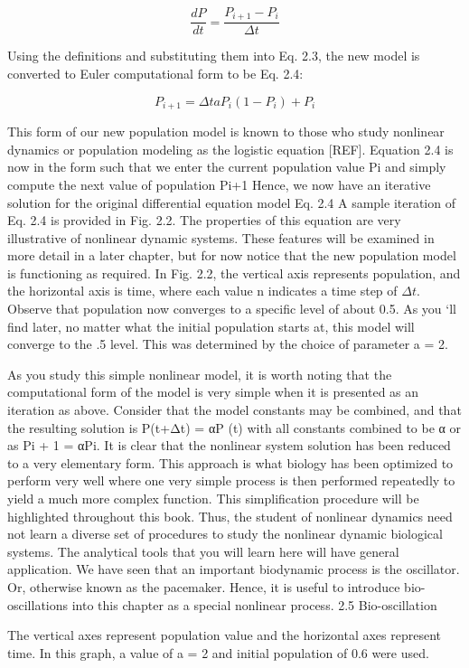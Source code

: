 \documentclass[12pt]{article}
\begin{document}
\[
\frac{dP}{dt} = \frac{P_{i+1} - P_i}{\Delta t}
\]


Using the definitions and substituting them into Eq. 2.3, the new model is converted
to Euler computational form to be Eq. 2.4:

\[
P_{i+1} = \Delta t a P_i(1-P_i) + P_i
\]

This form of our new population model is known to those who study nonlinear
dynamics or population modeling as the logistic equation [REF]. Equation 2.4 is
now in the form such that we enter the current population value Pi and simply compute
the next value of population Pi+1 Hence, we now have an iterative solution for
the original differential equation model Eq. 2.4 A sample iteration of Eq. 2.4 is
provided in Fig. 2.2. The properties of this equation are very illustrative of nonlinear
dynamic systems. These features will be examined in more detail in a later chapter,
but for now notice that the new population model is functioning as required. In
Fig. 2.2, the vertical axis represents population, and the horizontal axis is time,
where each value n indicates a time step of $\Delta t$. Observe that population now converges
to a specific level of about 0.5. As you ‘ll find later, no matter what the initial
population starts at, this model will converge to the .5 level. This was determined by
the choice of parameter a = 2.

\hfill

As you study this simple nonlinear model, it is worth noting that the computational
form of the model is very simple when it is presented as an iteration as above.
Consider that the model constants may be combined, and that the resulting solution
is P(t+Δt) = αP (t) with all constants combined to be α or as Pi + 1 = αPi. It is clear
that the nonlinear system solution has been reduced to a very elementary form. This
approach is what biology has been optimized to perform very well where one very
simple process is then performed repeatedly to yield a much more complex function.
This simplification procedure will be highlighted throughout this book. Thus,
the student of nonlinear dynamics need not learn a diverse set of procedures to study
the nonlinear dynamic biological systems. The analytical tools that you will learn
here will have general application. We have seen that an important biodynamic process
is the oscillator. Or, otherwise known as the pacemaker. Hence, it is useful to
introduce bio-oscillations into this chapter as a special nonlinear process.
2.5 Bio-oscillation

\hfill

The vertical axes represent population value and the horizontal axes represent
time. In this graph, a value of a = 2 and initial population of 0.6 were used.
\end{document}
